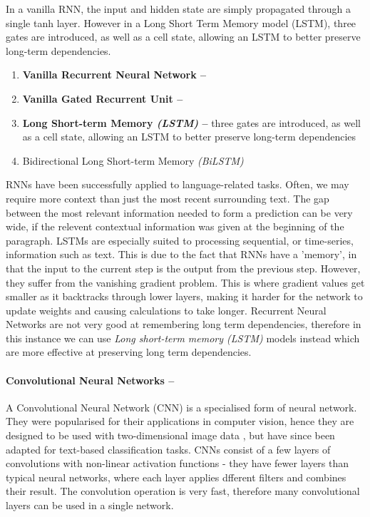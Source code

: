 \documentclass[12pt,a4paper]{article}
\begin{document}
In a vanilla RNN, the input and hidden state are simply propagated through a single tanh layer. However in a Long Short Term Memory model (LSTM), three gates are introduced, as well as a cell state, allowing an LSTM to better preserve long-term dependencies.\\

\begin{enumerate}
	\item \textbf{Vanilla Recurrent Neural Network -- }
	\item \textbf{Vanilla Gated Recurrent Unit -- }
	\item \textbf{Long Short-term Memory \textit{(LSTM)} -- } three gates are introduced, as well as a cell state, allowing an LSTM to better preserve long-term dependencies
	\item Bidirectional Long Short-term Memory \textit{(BiLSTM)}
\end{enumerate}

RNNs have been successfully applied to language-related tasks. Often, we may require more context than just the most recent surrounding text. The gap between the most relevant information needed to form a prediction can be very wide, if the relevent contextual information was given at the beginning of the paragraph. LSTMs are especially suited to processing sequential, or time-series, information such as text. This is due to the fact that RNNs have a 'memory', in that the input to the current step is the output from the previous step. However, they suffer from the vanishing gradient problem. This is where gradient values get smaller as it backtracks through lower layers, making it harder for the network to update weights and causing calculations to take longer. Recurrent Neural Networks are not very good at remembering long term dependencies, therefore in this instance we can use \textit{Long short-term memory (LSTM)} models \cite{hochreiter1997long} instead which are more effective at preserving long term dependencies.



\paragraph{Convolutional Neural Networks --}
A Convolutional Neural Network (CNN)\cite{lecun1998gradient} is a specialised form of neural network. They were popularised for their applications in computer vision, hence they are designed to be used with two-dimensional image data \cite{krizhevsky2012imagenet}, but have since been adapted for text-based classification tasks. CNNs consist of a few layers of convolutions with non-linear activation functions - they have fewer layers than typical neural networks, where each layer applies dfferent filters and combines their result. The convolution operation is very fast, therefore many convolutional layers can be used in a single network.
\end{document}
